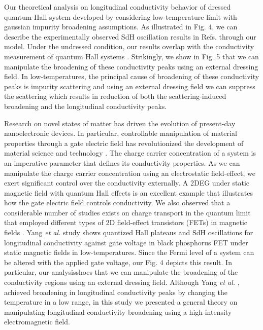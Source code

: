 \documentclass{article}
\begin{document}
\begin{itemize}
{  Our theoretical analysis on longitudinal conductivity behavior of dressed quantum Hall system developed by considering low-temperature limit with gaussian impurity broadening assumptions.
  As illustrated in Fig. 4, we can describe the experimentally observed SdH oscillation results in Refs.\cite{endo09,wakabayashi78} through our model.
  Under the undressed condition, our results overlap with the conductivity measurement of quantum Hall systems \cite{endo09}. Strikingly, we show in Fig. 5 that we can manipulate the broadening of these conductivity peaks using an external dressing field. In low-temperatures, the principal cause of broadening of these conductivity peaks is impurity scattering and using an external dressing field we can suppress the scattering which results in reduction of both the scattering-induced broadening and the longitudinal conductivity peaks.

  Research on novel states of matter has driven the evolution of present-day nanoelectronic devices. In particular, controllable manipulation of material properties through a gate electric field has revolutionized the development of material science and technology \cite{ahn03,deng18}.
  The charge carrier concentration of a system is an imperative parameter that defines its conductivity properties.
  As we can manipulate the charge carrier concentration using an electrostatic field-effect, we exert significant control over the conductivity externally.
  A 2DEG under static magnetic field with quantum Hall effects is an excellent example that illustrates how the gate electric field controls conductivity.
  We also observed that a considerable number of studies exists on charge transport in the quantum limit that employed different types of 2D field-effect transistors (FETs) in magnetic fields \cite{wakabayashi78,yang18,long20,li14}. Yang \textit{et al.} \cite{yang18} study shows quantized Hall plateaus and SdH oscillations for longitudinal conductivity against gate voltage in black phosphorus FET under static magnetic fields in low-temperatures. Since the Fermi level of a system can be altered with the applied gate voltage, our Fig. 4 depicts this result.
  In particular, our analysisshoes that we can manipulate the broadening of the conductivity regions using an external dressing field. Although Yang \textit{et al.} \cite{yang18}, achieved broadening in longitudinal conductivity peaks by changing the temperature in a low range, in this study we presented a general theory on manipulating longitudinal conductivity broadening using a high-intensity electromagnetic field.

}
\end{itemize}
\end{document}
